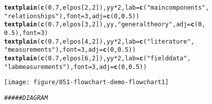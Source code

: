 \documentclass{article}\usepackage[]{graphicx}\usepackage[]{color}
\makeatletter
\def\maxwidth{ %
  \ifdim\Gin@nat@width>\linewidth
    \linewidth
  \else
    \Gin@nat@width
  \fi
}
\newcommand{\hlnum}[1]{\textcolor[rgb]{0.686,0.059,0.569}{#1}}%
\newcommand{\hlstr}[1]{\textcolor[rgb]{0.192,0.494,0.8}{#1}}%
\newcommand{\hlcom}[1]{\textcolor[rgb]{0.678,0.584,0.686}{\textit{#1}}}%
\newcommand{\hlopt}[1]{\textcolor[rgb]{0,0,0}{#1}}%
\newcommand{\hlstd}[1]{\textcolor[rgb]{0.345,0.345,0.345}{#1}}%
\newcommand{\hlkwc}[1]{\textcolor[rgb]{0.333,0.667,0.333}{#1}}%
\newcommand{\hlkwd}[1]{\textcolor[rgb]{0.737,0.353,0.396}{\textbf{#1}}}%
\newenvironment{kframe}{%
 \def\at@end@of@kframe{}%
 \ifinner\ifhmode%
  \def\at@end@of@kframe{\end{minipage}}%
  \begin{minipage}{\columnwidth}%
 \fi\fi%
 \def\FrameCommand##1{\hskip\@totalleftmargin \hskip-\fboxsep
 \colorbox{shadecolor}{##1}\hskip-\fboxsep
     \hskip-\linewidth \hskip-\@totalleftmargin \hskip\columnwidth}%
 \MakeFramed {\advance\hsize-\width
   \@totalleftmargin\z@ \linewidth\hsize
   \@setminipage}}%
 {\par\unskip\endMakeFramed%
 \at@end@of@kframe}
\newenvironment{knitrout}{}{} %
\makeatother
\begin{document}
\begin{knitrout}
\begin{kframe}
\begin{alltt}
\hlkwd{textplain}\hlstd{(}\hlkwd{c}\hlstd{(}\hlnum{0.7}\hlstd{, elpos[}\hlnum{2}\hlstd{,} \hlnum{2}\hlstd{]), yy} \hlopt{*} \hlnum{2}\hlstd{,} \hlkwc{lab} \hlstd{=} \hlkwd{c}\hlstd{(}\hlstr{"main components"}\hlstd{,}
    \hlstr{"relationships"}\hlstd{),} \hlkwc{font} \hlstd{=} \hlnum{3}\hlstd{,} \hlkwc{adj} \hlstd{=} \hlkwd{c}\hlstd{(}\hlnum{0}\hlstd{,} \hlnum{0.5}\hlstd{))}
\hlkwd{textplain}\hlstd{(}\hlkwd{c}\hlstd{(}\hlnum{0.7}\hlstd{, elpos[}\hlnum{3}\hlstd{,} \hlnum{2}\hlstd{]), yy,} \hlstr{"general theory"}\hlstd{,} \hlkwc{adj} \hlstd{=} \hlkwd{c}\hlstd{(}\hlnum{0}\hlstd{,}
    \hlnum{0.5}\hlstd{),} \hlkwc{font} \hlstd{=} \hlnum{3}\hlstd{)}
\hlkwd{textplain}\hlstd{(}\hlkwd{c}\hlstd{(}\hlnum{0.7}\hlstd{, elpos[}\hlnum{4}\hlstd{,} \hlnum{2}\hlstd{]), yy} \hlopt{*} \hlnum{2}\hlstd{,} \hlkwc{lab} \hlstd{=} \hlkwd{c}\hlstd{(}\hlstr{"literature"}\hlstd{,}
    \hlstr{"measurements"}\hlstd{),} \hlkwc{font} \hlstd{=} \hlnum{3}\hlstd{,} \hlkwc{adj} \hlstd{=} \hlkwd{c}\hlstd{(}\hlnum{0}\hlstd{,} \hlnum{0.5}\hlstd{))}
\hlkwd{textplain}\hlstd{(}\hlkwd{c}\hlstd{(}\hlnum{0.7}\hlstd{, elpos[}\hlnum{6}\hlstd{,} \hlnum{2}\hlstd{]), yy} \hlopt{*} \hlnum{2}\hlstd{,} \hlkwc{lab} \hlstd{=} \hlkwd{c}\hlstd{(}\hlstr{"field data"}\hlstd{,}
    \hlstr{"lab measurements"}\hlstd{),} \hlkwc{font} \hlstd{=} \hlnum{3}\hlstd{,} \hlkwc{adj} \hlstd{=} \hlkwd{c}\hlstd{(}\hlnum{0}\hlstd{,} \hlnum{0.5}\hlstd{))}
\end{alltt}
\end{kframe}
\texttt{[image: figure/051-flowchart-demo-flowchart1]} 
\begin{kframe}\begin{alltt}
\hlcom{##### DIAGRAM}


\end{alltt}
\end{kframe}
\end{knitrout}
\end{document}
